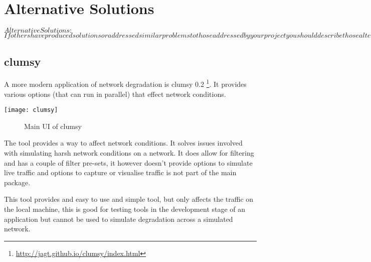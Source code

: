 
\section{Alternative Solutions}
$Alternative Solutions:$
$If others have produced solutions or addressed similar problems to those addressed by your project you should describe those alternative solutions here. Similarly, if several possible approaches suggest themselves as ways of solving the problems inherent in your project you should discuss those here. You should provide a comparative analysis and critical appraisal of each alternative solution approach or existing solution, identifying their key features and their strengths and weaknesses in relation to your project.$


\subsection{clumsy}
A more modern application of network degradation is clumsy 0.2 \footnote{\url{http://jagt.github.io/clumsy/index.html}}. It provides various options (that can run in parallel) that effect network conditions. 

\begin{center}
	\texttt{[image: clumsy]}
	\begin{figure}[h]
		\caption{Main UI of clumsy}
	\end{figure}
\end{center}

The tool provides a way to affect network conditions. It solves issues involved with simulating harsh network conditions on a network. It does allow for filtering and has a couple of filter pre-sets, it however doesn't provide options to simulate live traffic and options to capture or visualise traffic is not part of the main package.

This tool provides and easy to use and simple tool, but only affects the traffic on the local machine, this is good for testing tools in the development stage of an application but cannot be used to simulate degradation across a simulated network.

